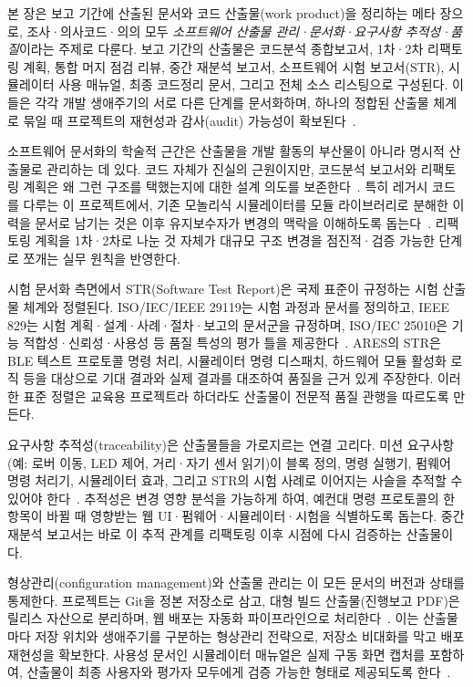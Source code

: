 본 장은 보고 기간에 산출된 문서와 코드 산출물(work product)을 정리하는 메타 장으로, 조사·의사코드·의의 모두 \emph{소프트웨어 산출물 관리·문서화·요구사항 추적성·품질}이라는 주제로 다룬다. 보고 기간의 산출물은 코드분석 종합보고서, 1차·2차 리팩토링 계획, 통합 머지 점검 리뷰, 중간 재분석 보고서, 소프트웨어 시험 보고서(STR), 시뮬레이터 사용 매뉴얼, 최종 코드정리 문서, 그리고 전체 소스 리스팅으로 구성된다. 이들은 각각 개발 생애주기의 서로 다른 단계를 문서화하며, 하나의 정합된 산출물 체계로 묶일 때 프로젝트의 재현성과 감사(audit) 가능성이 확보된다~\cite{mcconnell2004codecomplete,iso25010}.

소프트웨어 문서화의 학술적 근간은 산출물을 개발 활동의 부산물이 아니라 명시적 산출물로 관리하는 데 있다. 코드 자체가 진실의 근원이지만, 코드분석 보고서와 리팩토링 계획은 왜 그런 구조를 택했는지에 대한 설계 의도를 보존한다~\cite{martin2008cleancode,hunt1999pragmatic}. 특히 레거시 코드를 다루는 이 프로젝트에서, 기존 모놀리식 시뮬레이터를 모듈 라이브러리로 분해한 이력을 문서로 남기는 것은 이후 유지보수자가 변경의 맥락을 이해하도록 돕는다~\cite{feathers2004legacy,fowler2018refactoring}. 리팩토링 계획을 1차·2차로 나눈 것 자체가 대규모 구조 변경을 점진적·검증 가능한 단계로 쪼개는 실무 원칙을 반영한다.

시험 문서화 측면에서 STR(Software Test Report)은 국제 표준이 규정하는 시험 산출물 체계와 정렬된다. ISO/IEC/IEEE 29119는 시험 과정과 문서를 정의하고, IEEE 829는 시험 계획·설계·사례·절차·보고의 문서군을 규정하며, ISO/IEC 25010은 기능 적합성·신뢰성·사용성 등 품질 특성의 평가 틀을 제공한다~\cite{iso29119,ieee829,iso25010}. ARES의 STR은 BLE 텍스트 프로토콜 명령 처리, 시뮬레이터 명령 디스패치, 하드웨어 모듈 활성화 로직 등을 대상으로 기대 결과와 실제 결과를 대조하여 품질을 근거 있게 주장한다. 이러한 표준 정렬은 교육용 프로젝트라 하더라도 산출물이 전문적 품질 관행을 따르도록 만든다.

요구사항 추적성(traceability)은 산출물들을 가로지르는 연결 고리다. 미션 요구사항(예: 로버 이동, LED 제어, 거리·자기 센서 읽기)이 블록 정의, 명령 실행기, 펌웨어 명령 처리기, 시뮬레이터 효과, 그리고 STR의 시험 사례로 이어지는 사슬을 추적할 수 있어야 한다~\cite{iso29119,mcconnell2004codecomplete}. 추적성은 변경 영향 분석을 가능하게 하여, 예컨대 명령 프로토콜의 한 항목이 바뀔 때 영향받는 웹 UI·펌웨어·시뮬레이터·시험을 식별하도록 돕는다. 중간 재분석 보고서는 바로 이 추적 관계를 리팩토링 이후 시점에 다시 검증하는 산출물이다.

형상관리(configuration management)와 산출물 관리는 이 모든 문서의 버전과 상태를 통제한다. 프로젝트는 Git을 정본 저장소로 삼고, 대형 빌드 산출물(진행보고 PDF)은 릴리스 자산으로 분리하며, 웹 배포는 자동화 파이프라인으로 처리한다~\cite{chacon2014progit,ares-repo}. 이는 산출물마다 저장 위치와 생애주기를 구분하는 형상관리 전략으로, 저장소 비대화를 막고 배포 재현성을 확보한다. 사용성 문서인 시뮬레이터 매뉴얼은 실제 구동 화면 캡처를 포함하여, 산출물이 최종 사용자와 평가자 모두에게 검증 가능한 형태로 제공되도록 한다~\cite{nielsen1993usability,krug2014dontmakemethink}.

